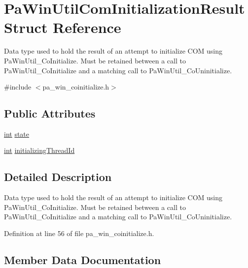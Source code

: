 \hypertarget{struct_pa_win_util_com_initialization_result}{}\section{Pa\+Win\+Util\+Com\+Initialization\+Result Struct Reference}
\label{struct_pa_win_util_com_initialization_result}


Data type used to hold the result of an attempt to initialize C\+OM using Pa\+Win\+Util\+\_\+\+Co\+Initialize. Must be retained between a call to Pa\+Win\+Util\+\_\+\+Co\+Initialize and a matching call to Pa\+Win\+Util\+\_\+\+Co\+Uninitialize.  




{\ttfamily \#include $<$pa\+\_\+win\+\_\+coinitialize.\+h$>$}

\subsection*{Public Attributes}
\begin{DoxyCompactItemize}
\item 
\hyperlink{xmltok_8h_a5a0d4a5641ce434f1d23533f2b2e6653}{int} \hyperlink{struct_pa_win_util_com_initialization_result_aebe3fcf1b606a3280125c8caae68fb44}{state}
\item 
\hyperlink{xmltok_8h_a5a0d4a5641ce434f1d23533f2b2e6653}{int} \hyperlink{struct_pa_win_util_com_initialization_result_a4523b33a8dd63e34ad278769ec882237}{initializing\+Thread\+Id}
\end{DoxyCompactItemize}


\subsection{Detailed Description}
Data type used to hold the result of an attempt to initialize C\+OM using Pa\+Win\+Util\+\_\+\+Co\+Initialize. Must be retained between a call to Pa\+Win\+Util\+\_\+\+Co\+Initialize and a matching call to Pa\+Win\+Util\+\_\+\+Co\+Uninitialize. 

Definition at line 56 of file pa\+\_\+win\+\_\+coinitialize.\+h.



\subsection{Member Data Documentation}
